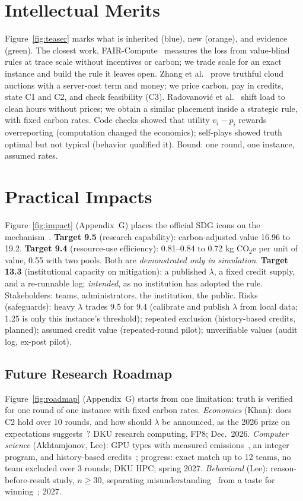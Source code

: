 \section{Intellectual Merits}\label{sec:merits}
Figure~\ref{fig:teaser} marks what is inherited (blue), new (orange), and evidence (green). The closest work, FAIR-Compute~\cite{fair_compute2026} measures the loss from value-blind rules at trace scale without incentives or carbon; we trade scale for an exact instance and build the rule it leaves open. Zhang et al.~\cite{zhang2015iaas} prove truthful cloud auctions with a server-cost term and money; we price carbon, pay in credits, state C1 and C2, and check feasibility (C3). Radovanovi\'c et al.~\cite{radovanovic2021carbon} shift load to clean hours without prices; we obtain a similar placement inside a strategic rule, with fixed carbon rates. Code checks showed that utility $v_i-p_i$ rewards overreporting (computation changed the economics); self-plays showed truth optimal but not typical (behavior qualified it). Bound: one round, one instance, assumed rates.

\section{Practical Impacts}\label{sec:impacts}
Figure~\ref{fig:impact} (Appendix~G) places the official SDG icons on the mechanism~\cite{un_sdg}. \textbf{Target 9.5} (research capability): carbon-adjusted value 16.96 to 19.2. \textbf{Target 9.4} (resource-use efficiency): 0.81--0.84 to 0.72 kg CO$_2$e per unit of value, 0.55 with two pools. Both are \emph{demonstrated only in simulation}. \textbf{Target 13.3} (institutional capacity on mitigation): a published $\lambda$, a fixed credit supply, and a re-runnable log; \emph{intended}, as no institution has adopted the rule. Stakeholders: teams, administrators, the institution, the public. Risks (safeguards): heavy $\lambda$ trades 9.5 for 9.4 (calibrate and publish $\lambda$ from local data; 1.25 is only this instance's threshold); repeated exclusion (history-based credits, planned); assumed credit value (repeated-round pilot); unverifiable values (audit log, ex-post pilot).

\subsection{Future Research Roadmap}\label{sec:roadmap}
Figure~\ref{fig:roadmap} (Appendix~G) starts from one limitation: truth is verified for one round of one instance with fixed carbon rates. \emph{Economics} (Khan): does C2 hold over 10 rounds, and how should $\lambda$ be announced, as the 2026 prize on expectations suggests~\cite{nobel2026}? DKU research computing, FP8; Dec.~2026. \emph{Computer science} (Akhtamjonov, Lee): GPU types with measured emissions~\cite{radovanovic2021carbon}, an integer program, and history-based credits~\cite{karma2023}; progress: exact match up to 12 teams, no team excluded over 3 rounds; DKU HPC; spring 2027. \emph{Behavioral} (Lee): reason-before-result study, $n\ge30$, separating misunderstanding~\cite{li2017} from a taste for winning~\cite{cooperfang2008}; 2027.

